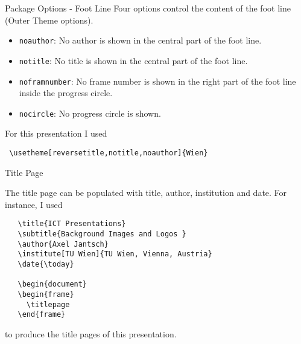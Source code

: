 \documentclass{beamer}
\begin{document}
\begin{frame}[fragile]{Package Options - Foot Line}
   Four options control the content of the foot line (Outer Theme options).
  
\begin{itemize}
\item \texttt{noauthor}: No author is shown in the central part of the
  foot line.
\item \texttt{notitle}: No title is shown in the central part of the
  foot line.
\item \texttt{noframnumber}: No frame number is shown in the right part
  of the foot line inside the progress circle.
\item \texttt{nocircle}: No progress circle is shown.
\end{itemize}

For this presentation I used

\verb| \usetheme[reversetitle,notitle,noauthor]{Wien} |

\end{frame}

\begin{frame}[fragile]{Title Page}

  \begin{block}{}

    The title page can be populated with title, author, institution
    and date. For instance, I used

    \vspace{3ex}

    \hspace{1em}
    \begin{minipage}{0.9\textwidth}
\begin{verbatim}
   \title{ICT Presentations}
   \subtitle{Background Images and Logos }
   \author{Axel Jantsch}
   \institute[TU Wien]{TU Wien, Vienna, Austria}
   \date{\today}

   \begin{document}
   \begin{frame}
     \titlepage
   \end{frame}\end{verbatim}
    \end{minipage}

    \vspace{3ex} to produce the title pages of this presentation.
  \end{block}
\end{frame}
\end{document}
